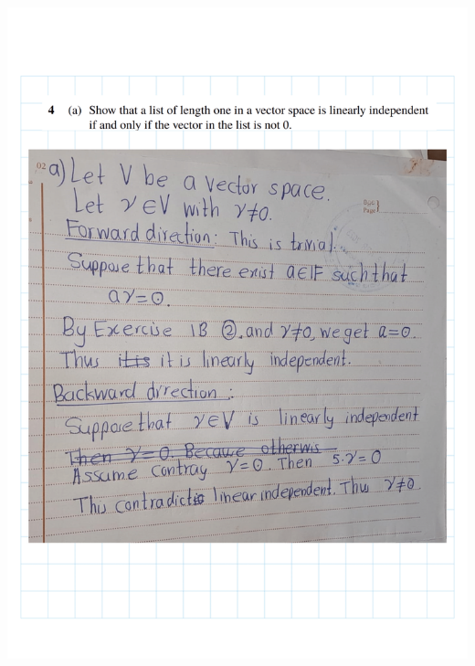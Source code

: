 \documentclass[
]{book}
\theoremstyle{definition}
\theoremstyle{definition}
\theoremstyle{definition}
\theoremstyle{definition}
\theoremstyle{remark}
\begin{document}
\includegraphics{fig/Ex2A/Ex2A-05.png}
\end{document}
